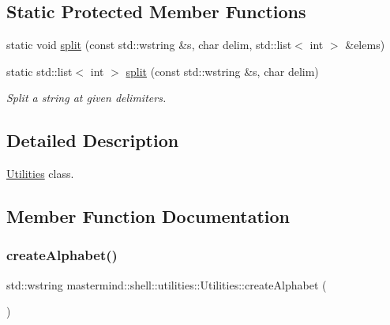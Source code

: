 \subsection*{Static Protected Member Functions}
\begin{DoxyCompactItemize}
\item 
static void \hyperlink{classmastermind_1_1shell_1_1utilities_1_1_utilities_a546b49b8a9c3a5e53400d48d6b6f5126}{split} (const std\+::wstring \&s, char delim, std\+::list$<$ int $>$ \&elems)
\item 
static std\+::list$<$ int $>$ \hyperlink{classmastermind_1_1shell_1_1utilities_1_1_utilities_a6fe21ac1d92d80b2380d27a4ebd657cb}{split} (const std\+::wstring \&s, char delim)
\begin{DoxyCompactList}\small\item\em Split a string at given delimiters. \end{DoxyCompactList}\end{DoxyCompactItemize}


\subsection{Detailed Description}
\hyperlink{classmastermind_1_1shell_1_1utilities_1_1_utilities}{Utilities} class. 

\subsection{Member Function Documentation}
\hypertarget{classmastermind_1_1shell_1_1utilities_1_1_utilities_a86393a0717a6c0522878b951bffa3cbc}{}\label{classmastermind_1_1shell_1_1utilities_1_1_utilities_a86393a0717a6c0522878b951bffa3cbc} 
\subsubsection{\texorpdfstring{create\+Alphabet()}{createAlphabet()}}
{\footnotesize\ttfamily std\+::wstring mastermind\+::shell\+::utilities\+::\+Utilities\+::create\+Alphabet (\begin{DoxyParamCaption}{ }\end{DoxyParamCaption})\hspace{0.3cm}{\ttfamily [static]}}



